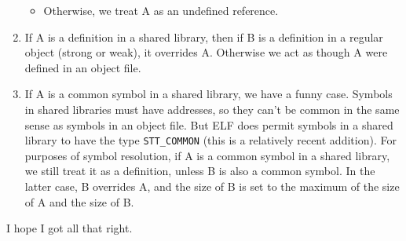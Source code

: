 \begin{enumerate}
\begin{itemize}
            \item Otherwise, we treat A as an undefined reference.
        \end{itemize}

    \item If A is a definition in a shared library, then if B is a definition
          in a regular object (strong or weak), it overrides A.  Otherwise we
          act as though A were defined in an object file.

    \item If A is a common symbol in a shared library, we have a funny case.
          Symbols in shared libraries must have addresses, so they can't
          be common in the same sense as symbols in an object file. But
          ELF does permit symbols in a shared library to have the type
          \texttt{STT\_COMMON} (this is a relatively recent addition). For
          purposes of symbol resolution, if A is a common symbol in a shared
          library, we still treat it as a definition, unless B is also a common
          symbol. In the latter case, B overrides A, and the size of B is set
          to the maximum of the size of A and the size of B.
\end{enumerate}

I hope I got all that right.
